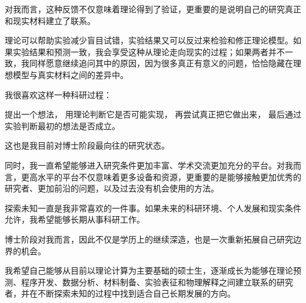 对我而言，这种反馈不仅意味着理论得到了验证，更重要的是说明自己的研究真正和现实材料建立了联系。

理论可以帮助实验减少盲目试错，实验结果又可以反过来检验和修正理论模型。如果实验结果和预测一致，我会享受这种从理论走向现实的过程；如果两者并不一致，我同样愿意继续追问其中的原因，因为很多真正有意义的问题，恰恰隐藏在理想模型与真实材料之间的差异中。

我很喜欢这样一种科研过程：

提出一个想法， 用理论判断它是否可能实现， 再尝试真正把它做出来， 最后通过实验判断最初的想法是否成立。

这也是我目前对博士阶段最向往的研究状态。

同时，我一直希望能够进入研究条件更加丰富、学术交流更加充分的平台。对我而言，更高水平的平台不仅意味着更多设备和资源，更重要的是能够接触更加优秀的研究者、更加前沿的问题，以及过去没有机会使用的方法。

探索未知一直是我非常喜欢的一件事。如果未来的科研环境、个人发展和现实条件允许，我希望能够长期从事科研工作。

博士阶段对我而言，因此不仅是学历上的继续深造，也是一次重新拓展自己研究边界的机会。

我希望自己能够从目前以理论计算为主要基础的硕士生，逐渐成长为能够在理论预测、程序开发、数据分析、材料制备、实验表征和物理解释之间建立联系的研究者，并在不断探索未知的过程中找到适合自己长期发展的方向。

